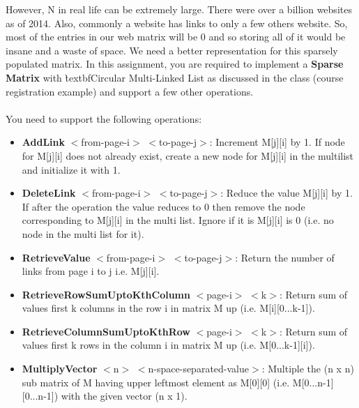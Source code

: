 \documentclass[20pt]{article}
\begin{document}
However, N in real life can be extremely large. There were over a billion websites as of 2014. Also, commonly a website has links to only a few others website. So, most of the entries in our web matrix will be 0 and so storing all of it would be insane and a waste of space. We need a better representation for this sparsely populated matrix.
In this assignment, you are required to implement a \textbf{Sparse Matrix} with \`textbf{Circular Multi-Linked List} as discussed in the class (course registration example) and support a few other operations. 
\\\\
You need to support the following operations:
\\
\begin{itemize}
\item \textbf{AddLink} $<$from-page-i$>$ $<$to-page-j$>$: Increment M[j][i] by 1. If node for M[j][i] does not already exist, create a new node for M[j][i] in the multilist and initialize it with 1.
\item \textbf{DeleteLink} $<$from-page-i$>$ $<$to-page-j$>$: Reduce the value M[j][i] by 1. If after the operation the value reduces to 0 then remove the node corresponding to M[j][i] in the multi list. Ignore if it is M[j][i] is 0 (i.e. no node in the multi list for it).
\item \textbf{RetrieveValue} $<$from-page-i$>$ $<$to-page-j$>$: Return the number of links from page i to j i.e. M[j][i].
\item \textbf{RetrieveRowSumUptoKthColumn} $<$page-i$>$ $<$k$>$: Return sum of values first k columns in the row i in matrix M up (i.e. M[i][0...k-1]).
\item \textbf{RetrieveColumnSumUptoKthRow} $<$page-i$>$ $<$k$>$: Return sum of values first k rows in the column i in matrix M up (i.e. M[0...k-1][i]).
\item \textbf{MultiplyVector} $<$n$>$ $<$n-space-separated-value$>$: Multiple the (n x n) sub matrix of M having upper leftmost element as M[0][0] (i.e. M[0...n-1][0...n-1]) with the given vector (n x 1).
\end{itemize}
\end{document}
